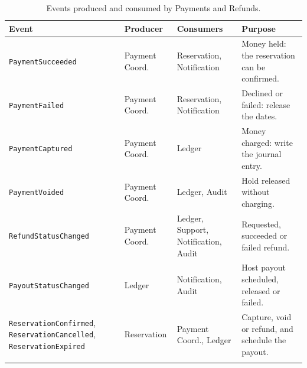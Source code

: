 \begin{longtable}{@{}L{3.6cm}L{2.4cm}L{3.2cm}L{3.8cm}@{}}
\toprule
\textbf{Event} & \textbf{Producer} & \textbf{Consumers} & \textbf{Purpose} \\
\midrule
\endhead
\texttt{Payment\allowbreak Succeeded} & Payment Coord. & Reservation, Notification &
  Money held: the reservation can be confirmed. \\
\texttt{Payment\allowbreak Failed} & Payment Coord. & Reservation, Notification &
  Declined or failed: release the dates. \\
\texttt{Payment\allowbreak Captured} & Payment Coord. & Ledger & Money charged: write
  the journal entry. \\
\texttt{Payment\allowbreak Voided} & Payment Coord. & Ledger, Audit & Hold released
  without charging. \\
\texttt{Refund\allowbreak Status\allowbreak Changed} & Payment Coord. & Ledger, Support,
  Notification, Audit & Requested, succeeded or failed refund. \\
\texttt{Payout\allowbreak Status\allowbreak Changed} & Ledger & Notification, Audit & Host payout
  scheduled, released or failed. \\
\texttt{Reservation\allowbreak Confirmed}, \texttt{Reservation\allowbreak Cancelled},
\texttt{Reservation\allowbreak Expired} & Reservation & Payment Coord., Ledger &
  Capture, void or refund, and schedule the payout. \\
\bottomrule
\caption{Events produced and consumed by Payments and Refunds.}
\label{tab:pay-events}
\end{longtable}

